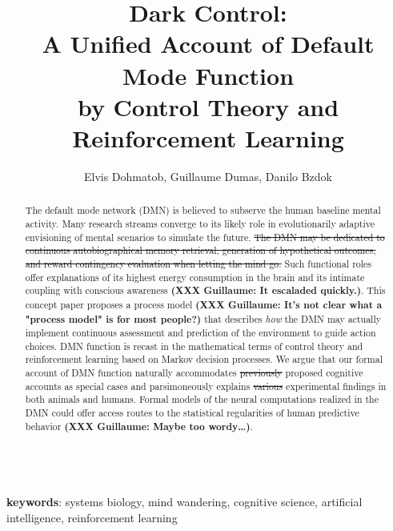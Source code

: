 \documentclass[10pt,letterpaper]{article}
\date{}
\title{Dark Control:\\
       A Unified Account of Default Mode Function\\
       by Control Theory and Reinforcement Learning}
\newcommand{\suggestadd}[1]{{\color{blue} #1}}
\newcommand{\suggestremove}[1]{{\color{red} \sout{#1}}}
\begin{document}
\author{Elvis Dohmatob, Guillaume Dumas, Danilo Bzdok\\
}

\maketitle


\begin{abstract}
The default mode network (DMN) is believed to subserve the human
baseline mental activity.
%
Many research streams converge to its likely role in evolutionarily adaptive
envisioning of mental scenarios to simulate the future.
\suggestremove{The DMN may be dedicated to continuous autobiographical memory retrieval,
generation of hypothetical outcomes,
and reward contingency evaluation when letting the mind go.}
Such functional roles offer explanations of
its highest energy consumption in the brain and
its intimate coupling with conscious awareness
\textbf{(XXX Guillaume: It escaladed quickly.)}.
%
This concept paper proposes a process model \textbf{(XXX Guillaume: It's not clear what a "process model" is for most people?)} that describes
\textit{how} the DMN may actually implement continuous
assessment and prediction of the environment to guide action choices.
DMN function is recast in the mathematical terms of
control theory and reinforcement learning based on Markov decision processes.
We argue that our formal account of DMN function
naturally accommodates \suggestremove{previously} proposed cognitive accounts as special cases and
parsimoneously explains \suggestremove{various} experimental findings in \suggestadd{both} animals and humans.
%
Formal models of the neural computations realized in the DMN
could offer access routes to the statistical regularities
of human predictive behavior \textbf{(XXX Guillaume: Maybe too wordy\ldots)}.
\end{abstract}

\textbf{\\keywords}: systems biology, mind wandering, cognitive science,
artificial intelligence,
reinforcement learning

\tableofcontents
\listoffigures
\listoftables
\end{document}
